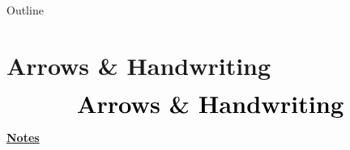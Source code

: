 \documentclass[10pt]{beamer}
\begin{document}
\begin{frame}{Outline}
    \tableofcontents[sections={2-}]
\end{frame}

\section{Arrows \& Handwriting}
\begin{frame}
    \begin{eqnarray*}
        &\text{{\huge \textbf{Arrows \& Handwriting}}}\\
    \end{eqnarray*}
\end{frame}
\begin{flushleft}
    \underline{\textbf{Notes}}\setlength{\parskip}{.15cm}\notesize\newline\par
\end{flushleft}
\end{document}
